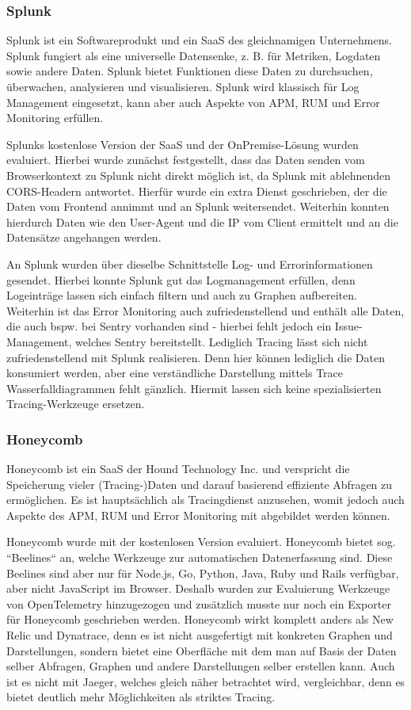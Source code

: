 \subsubsection{Splunk}

Splunk \cite{Splunk} ist ein Softwareprodukt und ein SaaS des gleichnamigen Unternehmens. Splunk fungiert als eine universelle Datensenke, z. B. für Metriken, Logdaten sowie andere Daten. Splunk bietet Funktionen diese Daten zu durchsuchen, überwachen, analysieren und visualisieren. Splunk wird klassisch für Log Management eingesetzt, kann aber auch Aspekte von APM, RUM und Error Monitoring erfüllen.

Splunks kostenlose Version der SaaS und der OnPremise-Lösung wurden evaluiert. Hierbei wurde zunächst festgestellt, dass das Daten senden vom Browserkontext zu Splunk nicht direkt möglich ist, da Splunk mit ablehnenden CORS-Headern antwortet. Hierfür wurde ein extra Dienst geschrieben, der die Daten vom Frontend annimmt und an Splunk weitersendet. Weiterhin konnten hierdurch Daten wie den User-Agent und die IP vom Client ermittelt und an die Datensätze angehangen werden.

An Splunk wurden über dieselbe Schnittstelle Log- und Errorinformationen gesendet. Hierbei konnte Splunk gut das Logmanagement erfüllen, denn Logeinträge lassen sich einfach filtern und auch zu Graphen aufbereiten. Weiterhin ist das Error Monitoring auch zufriedenstellend und enthält alle Daten, die auch bspw. bei Sentry vorhanden sind - hierbei fehlt jedoch ein Issue-Management, welches Sentry bereitstellt. Lediglich Tracing lässt sich nicht zufriedenstellend mit Splunk realisieren. Denn hier können lediglich die Daten konsumiert werden, aber eine verständliche Darstellung mittels Trace Wasserfalldiagrammen fehlt gänzlich. Hiermit lassen sich keine spezialisierten Tracing-Werkzeuge ersetzen.

\subsubsection{Honeycomb}

Honeycomb \cite{Honeycomb} ist ein SaaS der Hound Technology Inc. und verspricht die Speicherung vieler (Tracing-)Daten und darauf basierend effiziente Abfragen zu ermöglichen. Es ist hauptsächlich als Tracingdienst anzusehen, womit jedoch auch Aspekte des APM, RUM und Error Monitoring mit abgebildet werden können.

Honeycomb wurde mit der kostenlosen Version evaluiert. Honeycomb bietet sog. ``Beelines`` an, welche Werkzeuge zur automatischen Datenerfassung sind. Diese Beelines sind aber nur für Node.js, Go, Python, Java, Ruby und Rails verfügbar, aber nicht JavaScript im Browser. Deshalb wurden zur Evaluierung Werkzeuge von OpenTelemetry hinzugezogen und zusätzlich musste nur noch ein Exporter für Honeycomb geschrieben werden. Honeycomb wirkt komplett anders als New Relic und Dynatrace, denn es ist nicht ausgefertigt mit konkreten Graphen und Darstellungen, sondern bietet eine Oberfläche mit dem man auf Basis der Daten selber Abfragen, Graphen und andere Darstellungen selber erstellen kann. Auch ist es nicht mit Jaeger, welches gleich näher betrachtet wird, vergleichbar, denn es bietet deutlich mehr Möglichkeiten als striktes Tracing.

